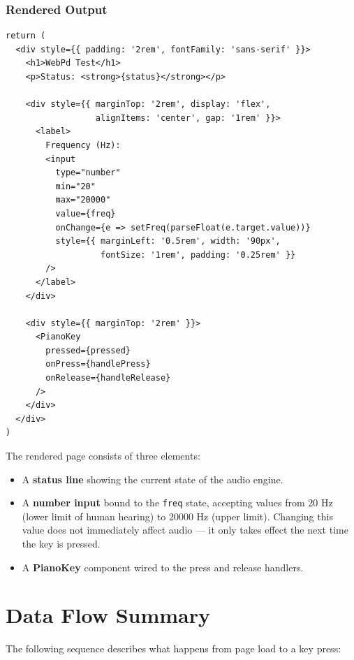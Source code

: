 \documentclass[12pt,a4paper]{article}
\begin{document}
\subsubsection{Rendered Output}

\begin{lstlisting}[style=js, caption={JSX returned by TestPd}]
return (
  <div style={{ padding: '2rem', fontFamily: 'sans-serif' }}>
    <h1>WebPd Test</h1>
    <p>Status: <strong>{status}</strong></p>

    <div style={{ marginTop: '2rem', display: 'flex',
                  alignItems: 'center', gap: '1rem' }}>
      <label>
        Frequency (Hz):
        <input
          type="number"
          min="20"
          max="20000"
          value={freq}
          onChange={e => setFreq(parseFloat(e.target.value))}
          style={{ marginLeft: '0.5rem', width: '90px',
                   fontSize: '1rem', padding: '0.25rem' }}
        />
      </label>
    </div>

    <div style={{ marginTop: '2rem' }}>
      <PianoKey
        pressed={pressed}
        onPress={handlePress}
        onRelease={handleRelease}
      />
    </div>
  </div>
)
\end{lstlisting}

The rendered page consists of three elements:

\begin{itemize}
  \item A \textbf{status line} showing the current state of the audio engine.
  \item A \textbf{number input} bound to the \texttt{freq} state, accepting values from 20 Hz (lower limit of human hearing) to 20000 Hz (upper limit). Changing this value does not immediately affect audio — it only takes effect the next time the key is pressed.
  \item A \textbf{PianoKey} component wired to the press and release handlers.
\end{itemize}

\section{Data Flow Summary}

The following sequence describes what happens from page load to a key press:
\end{document}
